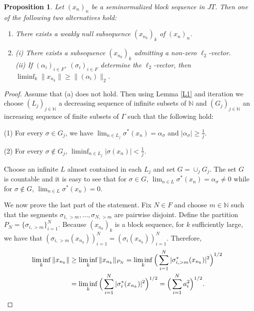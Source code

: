 \documentclass[12pt]{amsart}
\theoremstyle{plain}
\numberwithin{equation}{section}
\newcommand{\N}{\mathbb{N}}
\newtheorem{proposition}[theorem]{Proposition}
\begin{document}
\begin{proposition}\label{P1}
Let $(x_n)_n$ be a seminormalized block sequence in $JT$. Then one of the following two alternatives hold:
\begin{enumerate}
    \item[a)] There exists a weakly null subsequence $(x_{n_k})_k$ of $(x_n)_n$.
    \item[b)] (i) There exists a subsequence $(x_{n_k})_k$ admitting a non-zero $\ell_2$-vector.\\
    (ii) If $(\alpha_i)_{i \in F}$, $(\sigma_i)_{i\in F}$ determine the $\ell_2$-vector, then $\liminf_k \|x_{n_k}\| \geq \|(\alpha_i)\|_2$.
\end{enumerate}
\end{proposition}
\begin{proof}
Assume that (a) does not hold. Then using Lemma \ref{L1} and iteration we choose $(L_j)_{j\in \N}$ a decreasing sequence of infinite subsets of $\N$ and $(G_j)_{j\in\N}$ an increasing sequence of finite subsets of $\Gamma$ such that the following hold:

(1) For every $\sigma \in G_j$, we have $\lim_{n\in L_j}\sigma^*(x_n) = \alpha_{\sigma}$ and $|\alpha_{\sigma}| \geq \frac{1}{j}$.

(2) For every $\sigma \notin G_j$, $\liminf_{n\in L_j} |\sigma(x_n)| < \frac{1}{j}$.

Choose an infinite $L$ almost contained in each $L_j$ and set $G = \cup_j G_j$. The set $G$ is countable and it is easy to see that for $\sigma \in G$, $\lim_{n\in L} \sigma^*(x_n) = \alpha_{\sigma} \neq 0$ while for $\sigma \notin G$, $\lim_{n\in L} \sigma^*(x_n) =0$.




We now prove the last part of the statement. Fix $N\in F$ and choose $m\in\mathbb{N}$ such that the segments $\sigma_{1,>m},\ldots,\sigma_{N,>m}$ are pairwise disjoint. Define the partition $P_{N} = \{\sigma_{i,>m}\}_{i=1}^N$. Because $(x_{n_k})_k$ is a block sequence, for $k$ sufficiently large, we have that $(\sigma_{i,>m}(x_{n_k}))_{i=1}^N = (\sigma_i(x_{n_k}))_{i=1}^N$.  Therefore,
\begin{align*}
\liminf_k\|x_{n_k}\| &\geq \liminf_k\|x_{n_k}\|_{P_N} = \liminf_k\Big(\sum_{i=1}^N|\sigma^*_{i,>m}(x_{n_k})|^2\Big)^{1/2}\\
& = \liminf_k\Big(\sum_{i=1}^N|\sigma^*_{i}(x_{n_k})|^2\Big)^{1/2} = \Big(\sum_{i=1}^Na_i^2\Big)^{1/2}. \qedhere
\end{align*}
\end{proof}
\end{document}
